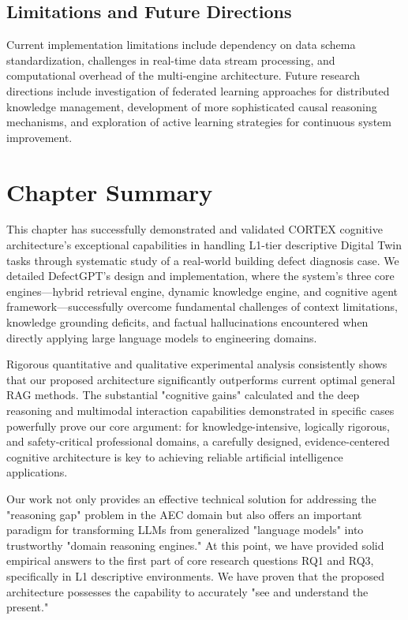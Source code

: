 \subsection{Limitations and Future Directions}

Current implementation limitations include dependency on data schema standardization, challenges in real-time data stream processing, and computational overhead of the multi-engine architecture. Future research directions include investigation of federated learning approaches for distributed knowledge management, development of more sophisticated causal reasoning mechanisms, and exploration of active learning strategies for continuous system improvement.

\section{Chapter Summary}

This chapter has successfully demonstrated and validated CORTEX cognitive architecture's exceptional capabilities in handling L1-tier descriptive Digital Twin tasks through systematic study of a real-world building defect diagnosis case. We detailed DefectGPT's design and implementation, where the system's three core engines—hybrid retrieval engine, dynamic knowledge engine, and cognitive agent framework—successfully overcome fundamental challenges of context limitations, knowledge grounding deficits, and factual hallucinations encountered when directly applying large language models to engineering domains.

Rigorous quantitative and qualitative experimental analysis consistently shows that our proposed architecture significantly outperforms current optimal general RAG methods. The substantial "cognitive gains" calculated and the deep reasoning and multimodal interaction capabilities demonstrated in specific cases powerfully prove our core argument: for knowledge-intensive, logically rigorous, and safety-critical professional domains, a carefully designed, evidence-centered cognitive architecture is key to achieving reliable artificial intelligence applications.

Our work not only provides an effective technical solution for addressing the "reasoning gap" problem in the AEC domain but also offers an important paradigm for transforming LLMs from generalized "language models" into trustworthy "domain reasoning engines." At this point, we have provided solid empirical answers to the first part of core research questions RQ1 and RQ3, specifically in L1 descriptive environments. We have proven that the proposed architecture possesses the capability to accurately "see and understand the present."


